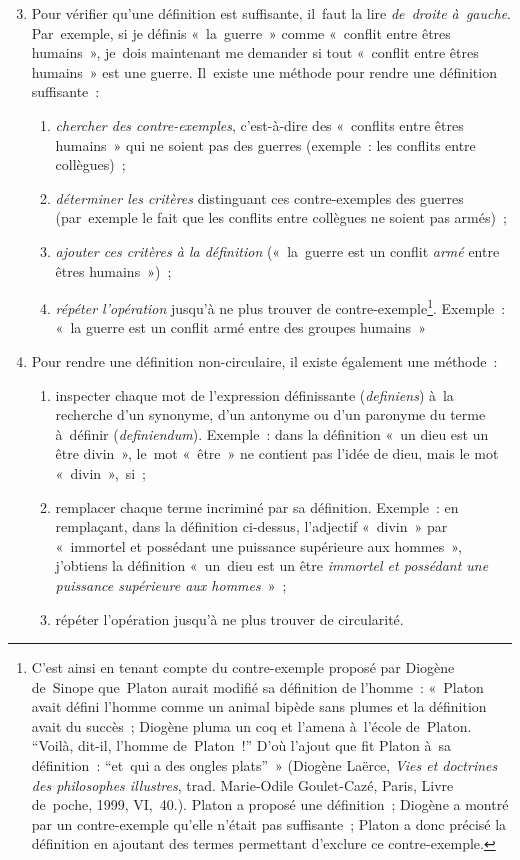 \documentclass[a4paper,12pt]{report}
\begin{document}
\begin{enumerate}
\setcounter{enumi}{2}
\item Pour vérifier qu'une définition est suffisante, il faut la lire
\emph{de droite à gauche}​. Par exemple, si je définis « la guerre » comme
« conflit entre êtres humains », je dois maintenant me demander si
tout « conflit entre êtres humains » est une guerre. Il existe une
méthode pour rendre une définition suffisante :
\begin{enumerate}
\item \emph{chercher des contre-exemples}, c'est-à-dire des « conflits entre
êtres humains » qui ne soient pas des guerres (exemple : les
conflits entre collègues) ;
\item \emph{déterminer les critères} distinguant ces contre-exemples des
guerres (par exemple le fait que les conflits entre collègues ne
soient pas armés) ;
\item \emph{ajouter ces critères à la définition} (« la guerre est un conflit
\emph{armé} entre êtres humains ») ;
\item \emph{répéter l'opération} jusqu'à ne plus trouver de
contre-exemple\footnote{C'est ainsi en tenant compte du contre-exemple proposé par
Diogène de Sinope que Platon aurait modifié sa définition de l'homme :
« Platon avait défini l'homme comme un animal bipède sans plumes et la
définition avait du succès ; Diogène pluma un coq et l'amena à l'école
de Platon. ``Voilà, dit-il, l'homme de Platon !'' D'où l'ajout que fit
Platon à sa définition : ``et qui a des ongles plats'' » (Diogène
Laërce, \emph{Vies et doctrines des philosophes illustres}, trad. Marie-Odile
Goulet-Cazé, Paris, Livre de poche, 1999, VI, 40.). Platon a proposé une
définition ; Diogène a montré par un contre-exemple qu'elle n'était pas
suffisante ; Platon a donc précisé la définition en ajoutant des termes
permettant d'exclure ce contre-exemple.}. Exemple : « la guerre est un conflit armé
entre des groupes humains »
\end{enumerate}

\item Pour rendre une définition non-circulaire, il existe également une
méthode :
\begin{enumerate}
\item inspecter chaque mot de l'expression définissante (\emph{definiens}​)
à la recherche d'un synonyme, d'un antonyme ou d'un paronyme du
terme à définir (\emph{definiendum}​). Exemple : dans la définition
« un dieu est un être divin​ », le mot « être » ne contient pas
l'idée de dieu, mais le mot « divin », si ;
\item remplacer chaque terme incriminé par sa définition. Exemple : en
remplaçant, dans la définition ci-dessus, l'adjectif « divin » par
« immortel et possédant une puissance supérieure aux hommes »,
j'obtiens la définition « un dieu est un être \emph{immortel et
possédant une puissance supérieure aux hommes}​ » ;
\item répéter l'opération jusqu'à ne plus trouver de circularité.
\end{enumerate}
\end{enumerate}
\end{document}
